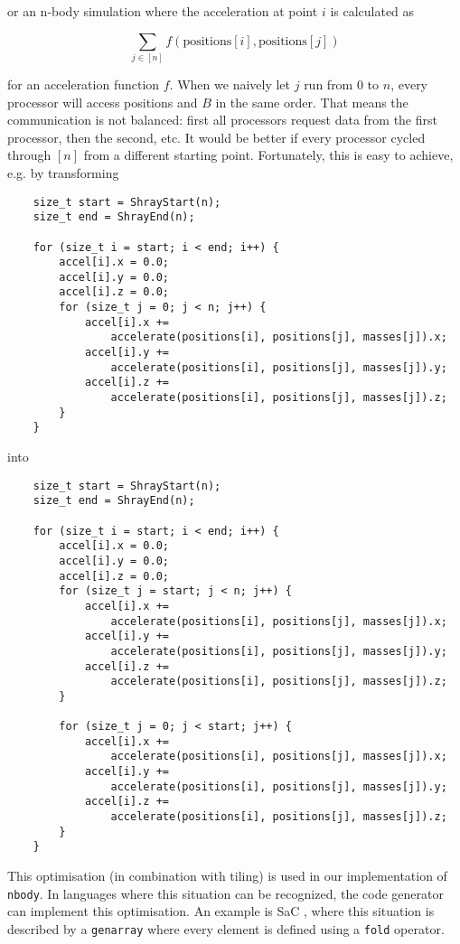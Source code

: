 \documentclass{article}
\begin{document}
or an n-body simulation where the acceleration at point $i$ is calculated as

$$\sum_{j \in [n]} f(\text{positions}[i], \text{positions}[j])$$ 

for an acceleration function $f$. When we naively let $j$ run from $0$ to $n$, every processor will
access positions and $B$ in the same order. That means the communication is not balanced: first 
all processors request data from the first processor, then the second, etc. It would be better 
if every processor cycled through $[n]$ from a different starting point. Fortunately, this is 
easy to achieve, e.g. by transforming

\begin{lstlisting}
    size_t start = ShrayStart(n);
    size_t end = ShrayEnd(n);
    
    for (size_t i = start; i < end; i++) {
        accel[i].x = 0.0;
        accel[i].y = 0.0;
        accel[i].z = 0.0;
        for (size_t j = 0; j < n; j++) {
            accel[i].x += 
                accelerate(positions[i], positions[j], masses[j]).x;
            accel[i].y += 
                accelerate(positions[i], positions[j], masses[j]).y;
            accel[i].z += 
                accelerate(positions[i], positions[j], masses[j]).z;
        }
    }
\end{lstlisting}

into 

\begin{lstlisting}
    size_t start = ShrayStart(n);
    size_t end = ShrayEnd(n);
    
    for (size_t i = start; i < end; i++) {
        accel[i].x = 0.0;
        accel[i].y = 0.0;
        accel[i].z = 0.0;
        for (size_t j = start; j < n; j++) {
            accel[i].x += 
                accelerate(positions[i], positions[j], masses[j]).x;
            accel[i].y += 
                accelerate(positions[i], positions[j], masses[j]).y;
            accel[i].z += 
                accelerate(positions[i], positions[j], masses[j]).z;
        }
        
        for (size_t j = 0; j < start; j++) {
            accel[i].x += 
                accelerate(positions[i], positions[j], masses[j]).x;
            accel[i].y += 
                accelerate(positions[i], positions[j], masses[j]).y;
            accel[i].z += 
                accelerate(positions[i], positions[j], masses[j]).z;
        }
    }
\end{lstlisting}

This optimisation (in combination with tiling) is used in our implementation of \texttt{nbody}. In languages where this situation can be recognized, the code generator can implement this optimisation. 
An example is SaC \cite{SAC}, where this situation is described by a \texttt{genarray} where every
element is defined using a \texttt{fold} operator.
\end{document}
